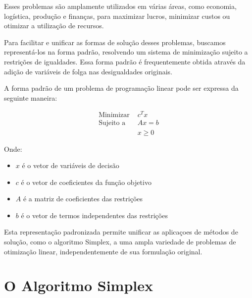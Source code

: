 \documentclass{article}
\begin{document}
Esses problemas são amplamente utilizados em várias áreas, como economia, logística, produção e finanças, para maximizar lucros, minimizar custos ou otimizar a utilização de recursos.


Para facilitar e unificar as formas de solução desses problemas, buscamos representá-los na forma padrão, resolvendo um sistema de minimização sujeito a restrições de igualdades. Essa forma padrão é frequentemente obtida através da adição de variáveis de folga nas desigualdades originais.

A forma padrão de um problema de programação linear pode ser expressa da seguinte maneira:

\begin{align*}
\text{Minimizar } & c^T x \\
\text{Sujeito a } & Ax = b \\
& x \geq 0
\end{align*}

Onde:
\begin{itemize}
    \item $x$ é o vetor de variáveis de decisão
    \item $c$ é o vetor de coeficientes da função objetivo
    \item $A$ é a matriz de coeficientes das restrições
    \item $b$ é o vetor de termos independentes das restrições
\end{itemize}

Esta representação padronizada permite unificar as aplicaçoes de métodos de solução, como o algoritmo Simplex, a uma ampla variedade de problemas de otimização linear, independentemente de sua formulação original.


\section{O Algoritmo Simplex}
\end{document}
